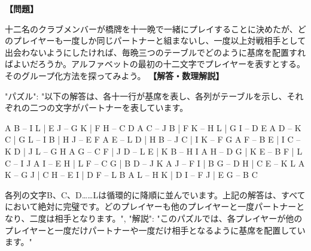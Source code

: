 \documentclass[10pt,a4paper,oneside,openany]{ltjsbook}
\begin{document}
\begin{tcolorbox}[colback=softblue,colframe=primaryblue,title=\textbf{第 265 問：A PUZZLE FOR CARD-PLAYERS.},arc=2mm,boxrule=1pt,breakable]
\textbf{【問題】}\par\vspace{0.3em}
十二名のクラブメンバーが橋牌を十一晩で一緒にプレイすることに決めたが、どのプレイヤーも一度しか同じパートナーと組まないし、一度以上対戦相手として出会わないようにしたければ、毎晩三つのテーブルでどのように基席を配置すればよいだろうか。アルファベットの最初の十二文字でプレイヤーを表すとする。そのグループ化方法を探ってみよう。
\tcblower
\textbf{【解答・数理解説】}\par\vspace{0.3em}
{
  "パズル": "以下の解答は、各十一行が基席を表し、各列がテーブルを示し、それぞれの二つの文字がパートナーを表しています。

    A B -- I L  |  E J -- G K  |  F H -- C D
    A C -- J B  |  F K -- H L  |  G I -- D E
    A D -- K C  |  G L -- I B  |  H J -- E F
    A E -- L D  |  H B -- J C  |  I K -- F G
    A F -- B E  |  I C -- K D  |  J L -- G H
    A G -- C F  |  J D -- L E  |  K B -- H I
    A H -- D G  |  K E -- B F  |  L C -- I J
    A I -- E H  |  L F -- C G  |  B D -- J K
    A J -- F I  |  B G -- D H  |  C E -- K L
    A K -- G J  |  C H -- E I  |  D F -- L B
    A L -- H K  |  D I -- F J  |  E G -- B C

各列の文字B、C、D……Lは循環的に降順に並んでいます。上記の解答は、すべてにおいて絶対に完璧です。どのプレイヤーも他のプレイヤーと一度パートナーとなり、二度は相手となります。",
  "解説": "このパズルでは、各プレイヤーが他のプレイヤーと一度だけパートナーや一度だけ相手となるように基席を配置しています。"
}
\end{tcolorbox}
\end{document}
